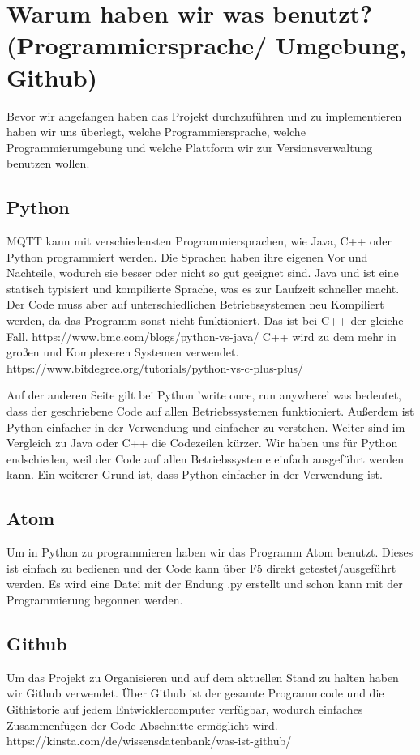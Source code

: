\section{Warum haben wir was benutzt? (Programmiersprache/ Umgebung, Github)}
Bevor wir angefangen haben das Projekt durchzuführen und zu implementieren haben wir uns überlegt, welche Programmiersprache, welche Programmierumgebung und welche Plattform wir zur Versionsverwaltung benutzen wollen.

\subsection{Python}
MQTT kann mit verschiedensten Programmiersprachen, wie Java, C++ oder Python programmiert werden.
Die Sprachen haben ihre eigenen Vor und Nachteile, wodurch sie besser oder nicht so gut geeignet sind.
Java und ist eine statisch typisiert und kompilierte Sprache, was es zur Laufzeit schneller macht. Der Code muss aber auf unterschiedlichen Betriebssystemen neu Kompiliert werden, da das Programm sonst nicht funktioniert. Das ist bei C++ der gleiche Fall. https://www.bmc.com/blogs/python-vs-java/
C++ wird zu dem mehr in großen und Komplexeren Systemen verwendet.
https://www.bitdegree.org/tutorials/python-vs-c-plus-plus/

Auf der anderen Seite gilt bei Python 'write once, run anywhere' was bedeutet, dass der geschriebene Code auf allen Betriebssystemen funktioniert. 
Außerdem ist Python einfacher in der Verwendung und einfacher zu verstehen. Weiter sind im Vergleich zu Java oder C++ die Codezeilen kürzer.
Wir haben uns für Python endschieden, weil der Code auf allen Betriebssysteme einfach ausgeführt werden kann. Ein weiterer Grund ist, dass Python einfacher in der Verwendung ist.


\subsection{Atom}
Um in Python zu programmieren haben wir das Programm Atom benutzt. Dieses ist einfach zu bedienen und der Code kann über F5 direkt getestet/ausgeführt werden.
Es wird eine Datei mit der Endung .py erstellt und schon kann mit der Programmierung begonnen werden.

\subsection{Github}
Um das Projekt zu Organisieren und auf dem aktuellen Stand zu halten haben wir Github verwendet.
Über Github ist der gesamte Programmcode und die Githistorie auf jedem Entwicklercomputer verfügbar, wodurch einfaches Zusammenfügen der Code Abschnitte  ermöglicht wird.
https://kinsta.com/de/wissensdatenbank/was-ist-github/